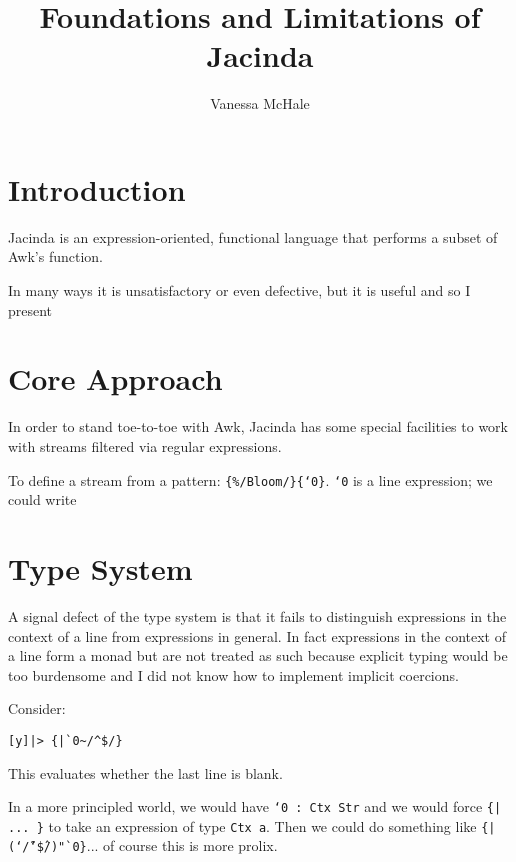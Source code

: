 \documentclass{report}
\begin{document}
\title{Foundations and Limitations of Jacinda}
\author {Vanessa McHale}
\maketitle

\tableofcontents

\section{Introduction}

Jacinda is an expression-oriented, functional language that performs a subset of Awk's function.

In many ways it is unsatisfactory or even defective, but it is useful and so I present

\section{Core Approach}

In order to stand toe-to-toe with Awk, Jacinda has some special facilities to work with streams filtered via regular expressions.

To define a stream from a pattern: {\tt \{\%/Bloom/\}\{`0\}}. {\tt`0} is a line expression; we could write

\section{Type System}

A signal defect of the type system is that it fails to distinguish expressions in the context of a line from expressions in general. In fact expressions in the context of a line form a monad but are not treated as such because explicit typing would be too burdensome and I did not know how to implement implicit coercions.

Consider:

\begin{verbatim}
[y]|> {|`0~/^$/}
\end{verbatim}

This evaluates whether the last line is blank.

\newcommand\Tilde{\char`\~}
\newcommand\Caret{\char`\^}

In a more principled world, we would have {\tt `0 : Ctx Str} and we would force {\tt \{| ... \}} to take an expression of type {\tt Ctx a}. Then we could do something like {\tt \{|(\Tilde/\Caret\$/)"`0\}}... of course this is more prolix.
\end{document}
